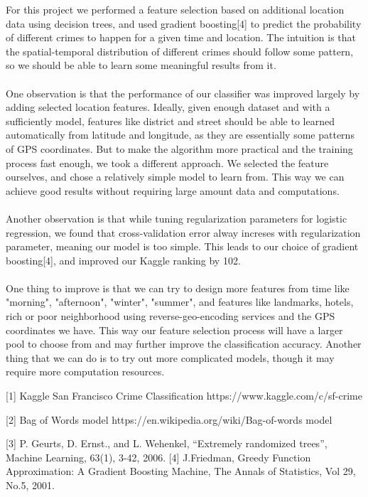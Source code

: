 \documentclass[12pt]{article}
\newenvironment{p5}[2][Part VI Discussion and Future Work]{\begin{trivlist}
\item[\hskip \labelsep {\bfseries #1}\hskip \labelsep {\bfseries #2}]}{\end{trivlist}}
\newenvironment{p6}[2][References]{\begin{trivlist}
\item[\hskip \labelsep {\bfseries #1}\hskip \labelsep {\bfseries #2}]}{\end{trivlist}}
\begin{document}
\newpage
\begin{p5}{}
\item{}
For this project we performed a feature selection based on additional location data using decision trees, and used gradient boosting[4] to predict the probability of different crimes to happen for a given time and location. The intuition is that the spatial-temporal distribution of different crimes should follow some pattern, so we should be able to learn some meaningful results from it.\\\\
One observation is that the performance of our classifier was improved largely by adding selected location features. Ideally, given enough dataset and with a sufficiently model, features like district and street should be able to learned automatically from latitude and longitude, as they are essentially some patterns of GPS coordinates. But to make the algorithm more practical and the training process fast enough, we took a different approach. We selected the feature ourselves, and chose a relatively simple model to learn from. This way we can achieve good results without requiring large amount data and computations.\\\\
Another observation is that while tuning regularization parameters for logistic regression, we found that cross-validation error alway increses with regularization parameter, meaning our model is too simple. This leads to our choice of gradient boosting[4], and improved our Kaggle ranking by 102.\\\\
One thing to improve is that we can try to design more features from time like "morning", "afternoon", "winter", "summer", and features like landmarks, hotels, rich or poor neighborhood using reverse-geo-encoding services and the GPS coordinates we have. This way our feature selection process will have a larger pool to choose from and may further improve the classification accuracy. Another thing that we can do is to try out more complicated models, though it may require more computation resources.
\end{p5}{}
\begin{p6}{}
\item{}
[1] Kaggle San Francisco Crime Classification https://www.kaggle.com/c/sf-crime
\item{}
[2] Bag of Words model https://en.wikipedia.org/wiki/Bag-of-words model 
\item{}
[3] P. Geurts, D. Ernst., and L. Wehenkel, ``Extremely randomized trees'', Machine Learning, 63(1), 3-42, 2006.
[4] J.Friedman, Greedy Function Approximation: A Gradient Boosting Machine, The Annals of Statistics, Vol 29, No.5, 2001.
\end{p6}

 
\end{document}

